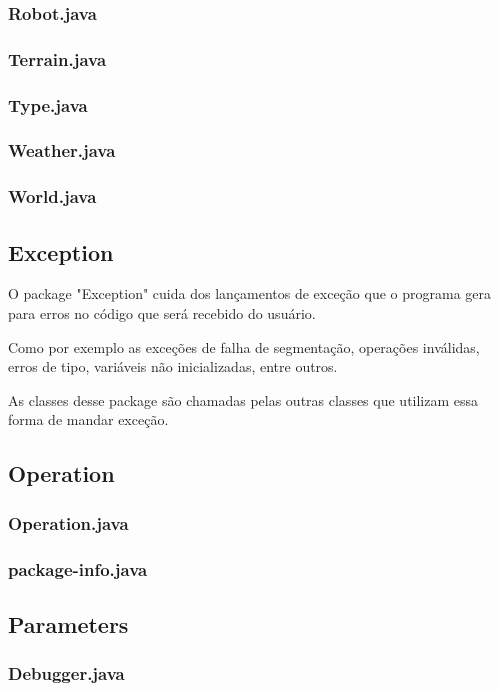 \documentclass[a4paper]{article}
\begin{document}
		\subsubsection{ Robot.java }
		\subsubsection{ Terrain.java }
		\subsubsection{ Type.java }
		\subsubsection{ Weather.java }						
		\subsubsection{ World.java }				
				
	\subsection{Exception}
		O package "Exception" cuida dos lançamentos de exceção
		que o programa gera para erros no código que será recebido
		do usuário.

		Como por exemplo as exceções de falha de segmentação,
		operações inválidas, erros de tipo, variáveis não
		inicializadas, entre outros.
		
		As classes desse package são chamadas pelas outras classes
		que utilizam essa forma de mandar exceção.
		 
	\subsection{Operation}
		\subsubsection{ Operation.java }
		\subsubsection{ package-info.java }
		
	\subsection{Parameters}
		\subsubsection{ Debugger.java }
\end{document}
